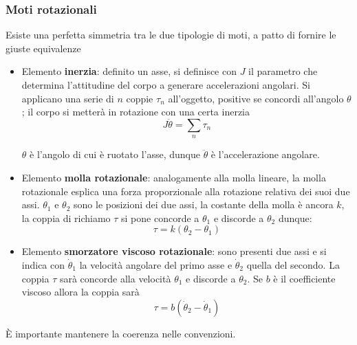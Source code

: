 \subsubsection{Moti rotazionali}
Esiste una perfetta simmetria tra le due tipologie di moti, a patto di fornire
le giuste equivalenze
\begin{itemize}
 \item Elemento \textbf{inerzia}: definito un asse, si definisce con $J$ il
parametro che determina l'attitudine del corpo a generare accelerazioni
angolari. Si applicano una serie di $n$ coppie $\tau_n$ all'oggetto, positive
se concordi all'angolo $\theta$; il corpo si metterà in rotazione con una
certa inerzia
$$
J\ddot{\theta} = \sum_n \tau_n
$$

$\theta$ è l'angolo di cui è ruotato l'asse, dunque $\ddot{\theta}$ è
l'accelerazione angolare.

 \item Elemento \textbf{molla rotazionale}: analogamente alla molla lineare, la
molla rotazionale esplica una forza proporzionale alla rotazione relativa dei
suoi due assi. $\theta_1$ e $\theta_2$ sono le posizioni dei due assi, la
costante della molla è ancora $k$, la coppia di richiamo $\tau$ si pone
concorde a $\theta_1$ e discorde a $\theta_2$ dunque:
$$
\tau = k\left(\theta_2 - \theta_1\right)
$$

 \item Elemento \textbf{smorzatore viscoso rotazionale}: sono presenti due assi
e si indica con $\dot{\theta}_1$ la velocità angolare del primo asse e
$\dot{\theta}_2$ quella del secondo. La coppia $\tau$ sarà concorde alla
velocità $\theta_1$ e discorde a $\theta_2$. Se $b$ è il coefficiente viscoso
allora la coppia sarà
$$
\tau = b(\dot{\theta}_2 - \dot{\theta}_1)
$$
\end{itemize}

È importante mantenere la coerenza nelle convenzioni.

























